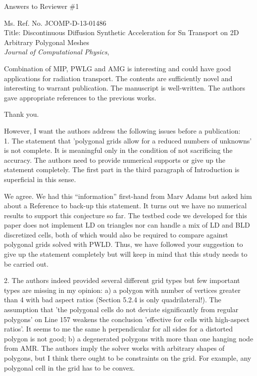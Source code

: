 \documentclass{article}
\begin{document}
\begin{center}
{ \Large Answers to Reviewer \#1}
\end{center}

\bigskip

\noindent Ms. Ref. No. JCOMP-D-13-01486\\
Title: Discontinuous Diffusion Synthetic Acceleration for Sn Transport on 2D Arbitrary Polygonal Meshes \\
{\it Journal of Computational Physics},\\

\bigskip
\bigskip

{
\color{blue}
 Combination of MIP, PWLG and AMG is interesting and could have good applications for radiation transport. The contents are sufficiently novel and interesting to warrant publication. The manuscript is well-written. The authors gave appropriate references to the previous works.
}

Thank you.

\bigskip

{
\color{blue}
However, I want the authors address the following issues before a publication:\\

1. The statement that 'polygonal grids allow for a reduced numbers of unknowns' is not complete. It is meaningful only in the condition of not sacrificing the accuracy. The authors need to provide numerical supports or give up the statement completely. The first part in the third paragraph of Introduction is superficial in this sense.
}

We agree. We had this ``information'' first-hand from Marv Adams but asked him about a Reference to back-up this statement. It turns out we have no numerical results to support this conjecture so far. The testbed code we developed for this paper does not implement LD on triangles nor can handle a mix of LD and BLD discretized cells, both of which would also be required to compare against polygonal grids solved with PWLD. Thus, we have followed your suggestion to give up the statement completely but will keep in mind that this study needs to be carried out. 

\bigskip


{
\color{blue}
2. The authors indeed provided several different grid types but few important types are missing in my opinion:
a) a polygon with number of vertices greater than 4 with bad aspect ratios (Section 5.2.4 is only quadrilateral!). The assumption that 'the polygonal cells do not deviate significantly from regular polygons' on Line 157 weakens the conclusion 'effective for cells with high-aspect ratios'. It seems to me the same h perpendicular for all sides for a distorted polygon is not good;
b) a degenerated polygons with more than one hanging node from AMR.
The authors imply the solver works with arbitrary shapes of polygons, but I think there ought to be constraints on the grid. For example, any polygonal cell in the grid has to be convex.
}
\end{document}
